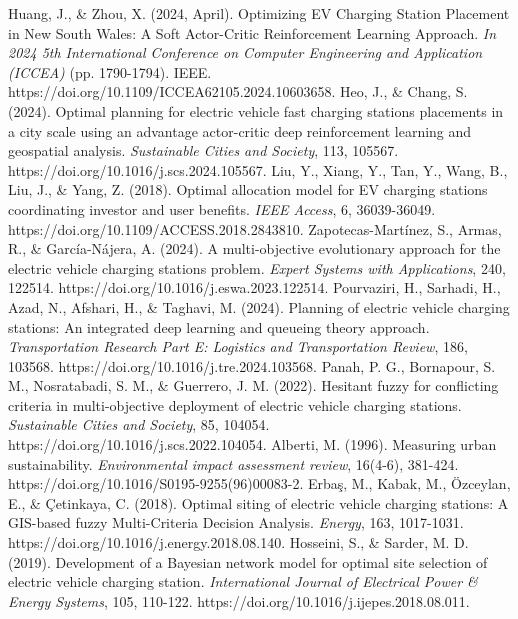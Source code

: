 \documentclass[preprint,12pt]{elsarticle}
\begin{document}
\begin{thebibliography}{00}
Huang, J., \& Zhou, X. (2024, April). Optimizing EV Charging Station Placement in New South Wales: A Soft Actor-Critic Reinforcement Learning Approach. \textit{In 2024 5th International Conference on Computer Engineering and Application (ICCEA)} (pp. 1790-1794). IEEE. https://doi.org/10.1109/ICCEA62105.2024.10603658.
Heo, J., \& Chang, S. (2024). Optimal planning for electric vehicle fast charging stations placements in a city scale using an advantage actor-critic deep reinforcement learning and geospatial analysis. \textit{Sustainable Cities and Society}, 113, 105567. https://doi.org/10.1016/j.scs.2024.105567.
Liu, Y., Xiang, Y., Tan, Y., Wang, B., Liu, J., \& Yang, Z. (2018). Optimal allocation model for EV charging stations coordinating investor and user benefits. \textit{IEEE Access}, 6, 36039-36049. https://doi.org/10.1109/ACCESS.2018.2843810.
Zapotecas-Martínez, S., Armas, R., \& García-Nájera, A. (2024). A multi-objective evolutionary approach for the electric vehicle charging stations problem. \textit{Expert Systems with Applications}, 240, 122514. https://doi.org/10.1016/j.eswa.2023.122514.
Pourvaziri, H., Sarhadi, H., Azad, N., Afshari, H., \& Taghavi, M. (2024). Planning of electric vehicle charging stations: An integrated deep learning and queueing theory approach. \textit{Transportation Research Part E: Logistics and Transportation Review}, 186, 103568. https://doi.org/10.1016/j.tre.2024.103568.
Panah, P. G., Bornapour, S. M., Nosratabadi, S. M., \& Guerrero, J. M. (2022). Hesitant fuzzy for conflicting criteria in multi-objective deployment of electric vehicle charging stations. \textit{Sustainable Cities and Society}, 85, 104054. https://doi.org/10.1016/j.scs.2022.104054.
Alberti, M. (1996). Measuring urban sustainability. \textit{Environmental impact assessment review}, 16(4-6), 381-424. https://doi.org/10.1016/S0195-9255(96)00083-2.
Erbaş, M., Kabak, M., Özceylan, E., \& Çetinkaya, C. (2018). Optimal siting of electric vehicle charging stations: A GIS-based fuzzy Multi-Criteria Decision Analysis. \textit{Energy}, 163, 1017-1031. https://doi.org/10.1016/j.energy.2018.08.140.
Hosseini, S., \& Sarder, M. D. (2019). Development of a Bayesian network model for optimal site selection of electric vehicle charging station. \textit{International Journal of Electrical Power \& Energy Systems}, 105, 110-122. https://doi.org/10.1016/j.ijepes.2018.08.011.

\end{thebibliography}
\end{document}
